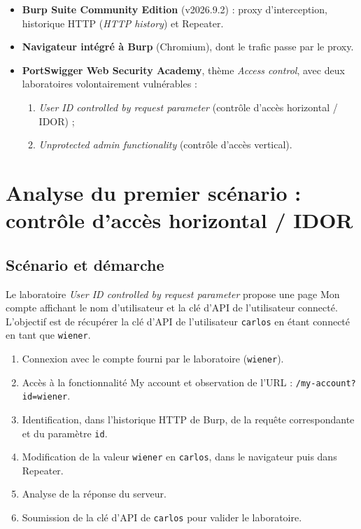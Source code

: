 \documentclass{rapportENSIAS}
\begin{document}
\begin{itemize}
  \item \textbf{Burp Suite Community Edition} (v2026.9.2) : proxy d'interception, historique HTTP (\textit{HTTP history}) et Repeater.
  \item \textbf{Navigateur intégré à Burp} (Chromium), dont le trafic passe par le proxy.
  \item \textbf{PortSwigger Web Security Academy}, thème \textit{Access control}, avec deux laboratoires volontairement vulnérables :
  \begin{enumerate}
    \item \textit{User ID controlled by request parameter} (contrôle d'accès horizontal / IDOR) ;
    \item \textit{Unprotected admin functionality} (contrôle d'accès vertical).
  \end{enumerate}
\end{itemize}


\section{Analyse du premier scénario : contrôle d'accès horizontal / IDOR}

\subsection{Scénario et démarche}

Le laboratoire \textit{User ID controlled by request parameter} propose une page \og Mon compte \fg{} affichant le nom d'utilisateur et la clé d'API de l'utilisateur connecté. L'objectif est de récupérer la clé d'API de l'utilisateur \texttt{carlos} en étant connecté en tant que \texttt{wiener}.

\begin{enumerate}
  \item Connexion avec le compte fourni par le laboratoire (\texttt{wiener}).
  \item Accès à la fonctionnalité \og My account \fg{} et observation de l'URL : \texttt{/my-account?id=wiener}.
  \item Identification, dans l'historique HTTP de Burp, de la requête correspondante et du paramètre \texttt{id}.
  \item Modification de la valeur \texttt{wiener} en \texttt{carlos}, dans le navigateur puis dans Repeater.
  \item Analyse de la réponse du serveur.
  \item Soumission de la clé d'API de \texttt{carlos} pour valider le laboratoire.
\end{enumerate}
\end{document}
